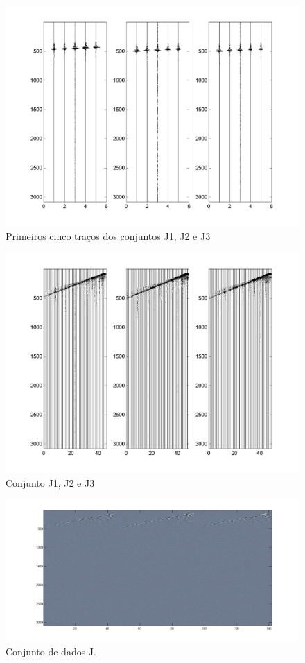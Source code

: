 \begin{figure}[!h]
\centering
  \includegraphics[scale=1.01]{fig/fig_J1.png}
  \caption{Primeiros cinco traços dos conjuntos J1, J2 e J3}
  \label{Figura:j1j2j3}
\end{figure}

\begin{figure}[!h]
\centering
\includegraphics[scale=1.01]{fig/fig_J2.png}
\caption{Conjunto J1, J2 e J3}
\label{Figura:j1j2j3comp}
\end{figure}

\begin{figure}[!h]
\centering
\includegraphics[scale=1]{fig/over_img_j.png}
\caption{Conjunto de dados J.}
\label{Figura:conjuntodedadosj}
\end{figure}

